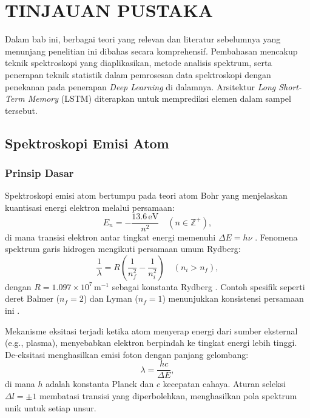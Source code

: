 


\chapter{TINJAUAN PUSTAKA}
\par Dalam bab ini, berbagai teori yang relevan dan literatur sebelumnya yang menunjang penelitian ini dibahas secara komprehensif. Pembahasan mencakup teknik spektroskopi yang diaplikasikan, metode analisis spektrum, serta penerapan teknik statistik dalam pemrosesan data spektroskopi dengan penekanan pada penerapan \textit{Deep Learning} di dalamnya. Arsitektur \textit{Long Short-Term Memory} (LSTM) diterapkan untuk memprediksi elemen dalam sampel tersebut.

\section{Spektroskopi Emisi Atom}
\subsection{Prinsip Dasar}
\label{subsec:prinsip-dasar}

Spektroskopi emisi atom bertumpu pada teori atom Bohr yang menjelaskan kuantisasi energi elektron melalui persamaan:
\begin{equation}
\label{eq:energi-bohr}
E_n = -\frac{13.6 \, \text{eV}}{n^2} \quad (n \in \mathbb{Z}^+),
\end{equation}
di mana transisi elektron antar tingkat energi memenuhi $\Delta E = h\nu$ \citep{Beiser1992}. Fenomena spektrum garis hidrogen mengikuti persamaan umum Rydberg:
\begin{equation}
\label{eq:rydberg-umum}
\frac{1}{\lambda} = R \left( \frac{1}{n_f^2} - \frac{1}{n_i^2} \right) \quad (n_i > n_f),
\end{equation}
dengan $R = 1.097 \times 10^7 \, \text{m}^{-1}$ sebagai konstanta Rydberg \citep{Beiser1992}. Contoh spesifik seperti deret Balmer ($n_f = 2$) dan Lyman ($n_f = 1$) menunjukkan konsistensi persamaan ini \citep{Griffiths2005}.

Mekanisme eksitasi terjadi ketika atom menyerap energi dari sumber eksternal (e.g., plasma), menyebabkan elektron berpindah ke tingkat energi lebih tinggi. De-eksitasi menghasilkan emisi foton dengan panjang gelombang:
\[
\lambda = \frac{hc}{\Delta E},
\]
di mana $h$ adalah konstanta Planck dan $c$ kecepatan cahaya. Aturan seleksi $\Delta l = \pm 1$ \citep{Liboff2003} membatasi transisi yang diperbolehkan, menghasilkan pola spektrum unik untuk setiap unsur.

